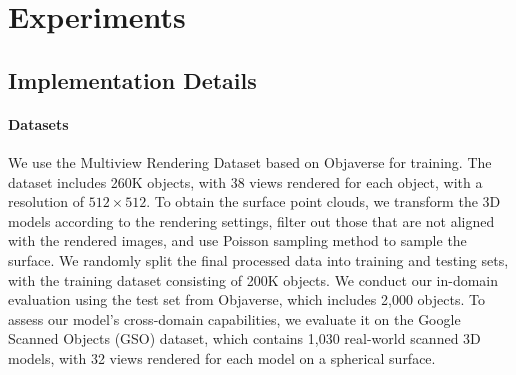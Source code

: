 \section{Experiments}
\subsection{Implementation Details}
\label{sec:implemenet}
\paragraph{Datasets} We use the Multiview Rendering Dataset \cite{qiu2023richdreamer,zuo2024sparse3d} based on Objaverse \cite{objaverse} for training. The dataset includes 260K objects, with 38 views rendered for each object, with a resolution of $512\times512$. To obtain the surface point clouds, we transform the 3D models according to the rendering settings, filter out those that are not aligned with the rendered images, and use Poisson sampling method\cite{poisson} to sample the surface.  We randomly split the final processed data into training and testing sets, with the training dataset consisting of 200K objects.
We conduct our in-domain evaluation using the test set from Objaverse, which includes 2,000 objects. To assess our model's cross-domain capabilities, we evaluate it on the Google Scanned Objects (GSO) \cite{downs2022google}dataset, which contains 1,030 real-world scanned 3D models, with 32 views rendered for each model on a spherical surface.



